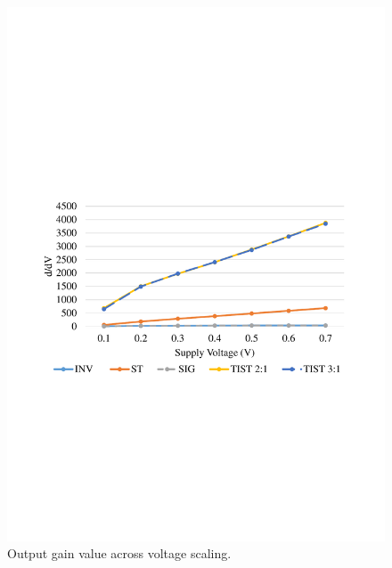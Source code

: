 \documentclass[pgmicro,mestrado,english]{iiufrgs}
\begin{document}
    \begin{figure}[]
        \centering
            \includegraphics[width=1\textwidth, trim={1.25cm 9cm 2cm 10cm}, clip]{gainComp.pdf}
            \caption{Output gain value across voltage scaling.}
        \label{figsGainComp}
    \end{figure}
    
\end{document}
